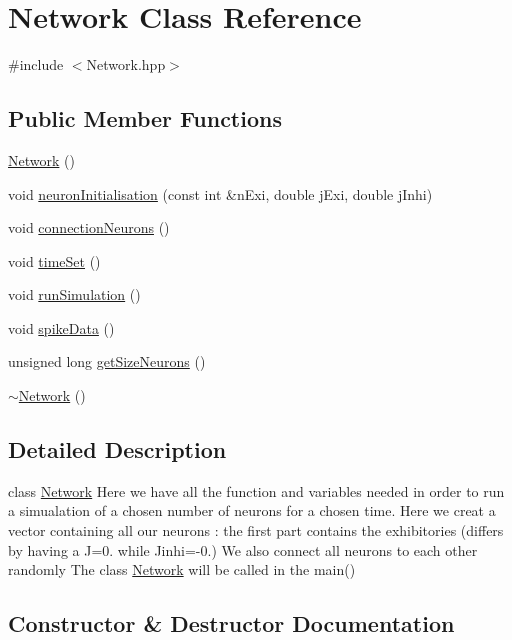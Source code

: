 \hypertarget{class_network}{}\section{Network Class Reference}
\label{class_network}


{\ttfamily \#include $<$Network.\+hpp$>$}

\subsection*{Public Member Functions}
\begin{DoxyCompactItemize}
\item 
\hyperlink{class_network_a3cc2fb4f8fa4d507077e8da85ce5a1c8}{Network} ()
\item 
void \hyperlink{class_network_ac37f578756aa63cd1df9f0ccbdd20aa1}{neuron\+Initialisation} (const int \&n\+Exi, double j\+Exi, double j\+Inhi)
\item 
void \hyperlink{class_network_a431e2ab1f9bf907746583ac391832da3}{connection\+Neurons} ()
\item 
void \hyperlink{class_network_a283257767adc8e004991b6fd14e1fc1d}{time\+Set} ()
\item 
void \hyperlink{class_network_a0a2cdb2bc8a68e83748d280212e7f48b}{run\+Simulation} ()
\item 
void \hyperlink{class_network_a051978c15b901e42c7353d8dff33120d}{spike\+Data} ()
\item 
unsigned long \hyperlink{class_network_a60cc1bdce0650a7f40dc450408a5eaf2}{get\+Size\+Neurons} ()
\item 
\hyperlink{class_network_a7a4e19cdb4bf0c7ecf82baa643831492}{$\sim$\+Network} ()
\end{DoxyCompactItemize}


\subsection{Detailed Description}
class \hyperlink{class_network}{Network} Here we have all the function and variables needed in order to run a simualation of a chosen number of neurons for a chosen time. Here we creat a vector containing all our neurons \+: the first part contains the exhibitories (differs by having a J=0. while Jinhi=-\/0.) We also connect all neurons to each other randomly The class \hyperlink{class_network}{Network} will be called in the main() 

\subsection{Constructor \& Destructor Documentation}
\mbox{\label{class_network_a3cc2fb4f8fa4d507077e8da85ce5a1c8}} 

